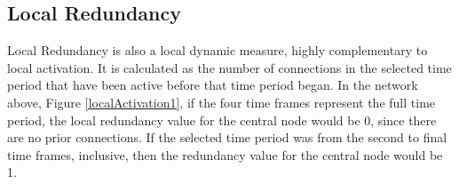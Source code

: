 
\subsection{Local Redundancy}

Local Redundancy is also a local dynamic measure, highly complementary to local activation. It is calculated as the number of connections in the selected time period that have been active before that time period began. In the network above, Figure \ref{localActivation1}, if the four time frames represent the full time period, the local redundancy value for the central node would be 0, since there are no prior connections. If the selected time period was from the second to final time frames, inclusive, then the redundancy value for the central node would be 1.





